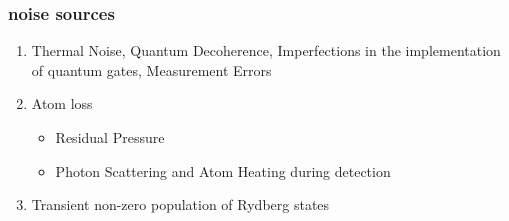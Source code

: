 \documentclass[18 pt]{beamer}
\begin{document}
\begin{frame}
\frametitle{noise sources}
\begin{enumerate}
  \item Thermal Noise, Quantum Decoherence, Imperfections in the implementation of quantum gates, Measurement Errors
  \item Atom loss
  \begin{itemize}
    \item Residual Pressure
    \item Photon Scattering and Atom Heating during detection
  \end{itemize}
  \item Transient non-zero population of Rydberg states
\end{enumerate}
\end{frame}
\end{document}
